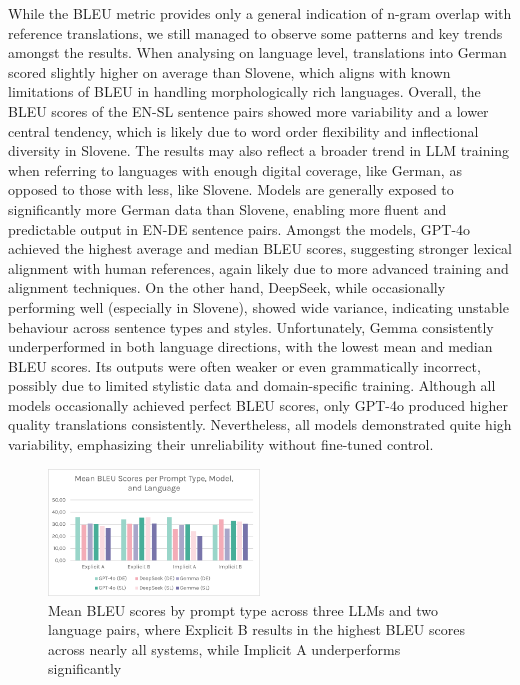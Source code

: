 \documentclass[fleqn,moreauthors,10pt]{ds_report}
\begin{document}
	While the BLEU metric provides only a general indication of n-gram overlap with reference translations, we still managed to observe some patterns and key trends amongst the results.
	When analysing on language level, translations into German scored slightly higher on average than Slovene, which aligns with known limitations of BLEU in handling morphologically rich languages. Overall, the BLEU scores of the EN-SL sentence pairs showed more variability and a lower central tendency, which is likely due to word order flexibility and inflectional diversity in Slovene. The results may also reflect a broader trend in LLM training when referring to languages with enough digital coverage, like German, as opposed to those with less, like Slovene. Models are generally exposed to significantly more German data than Slovene, enabling more fluent and predictable output in EN-DE sentence pairs.
	Amongst the models, GPT-4o achieved the highest average and median BLEU scores, suggesting stronger lexical alignment with human references, again likely due to more advanced training and alignment techniques. On the other hand, DeepSeek, while occasionally performing well (especially in Slovene), showed wide variance, indicating unstable behaviour across sentence types and styles. Unfortunately, Gemma consistently underperformed in both language directions, with the lowest mean and median BLEU scores. Its outputs were often weaker or even grammatically incorrect, possibly due to limited stylistic data and domain-specific training.
	Although all models occasionally achieved perfect BLEU scores, only GPT-4o produced higher quality translations consistently. Nevertheless, all models demonstrated quite high variability, emphasizing their unreliability without fine-tuned control.
	
	\begin{figure}[h]
		\centering
		\includegraphics[width=0.5\textwidth]{image1.png}
		\caption{Mean BLEU scores by prompt type across three LLMs and two language pairs, where Explicit B results in the highest BLEU scores across nearly all systems, while Implicit A underperforms significantly}		
		\label{Figure 2}
	\end{figure}
\end{document}
